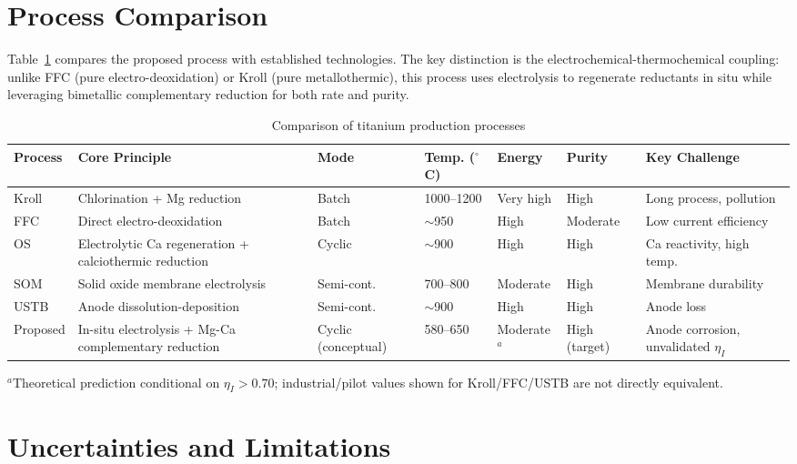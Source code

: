 \documentclass[sn-mathphys,Numbered]{sn-jnl}
\begin{document}
\section{Process Comparison}

Table~\ref{tab:compare} compares the proposed process with established technologies. The key distinction is the electrochemical-thermochemical coupling: unlike FFC (pure electro-deoxidation) or Kroll (pure metallothermic), this process uses electrolysis to regenerate reductants in situ while leveraging bimetallic complementary reduction for both rate and purity.

\begin{table}[!ht]
  \centering
  \caption{Comparison of titanium production processes}
  \label{tab:compare}
  \footnotesize
  \begin{tabularx}{\linewidth}{@{} p{1.5cm} p{3.0cm} p{1.2cm} p{1.0cm} p{1.2cm} p{1.0cm} X @{}}
  \toprule
  Process & Core Principle & Mode & Temp. ($^{\circ}$C) & Energy & Purity & Key Challenge \\
  \midrule
  Kroll & Chlorination + Mg reduction & Batch & 1000--1200 & Very high & High & Long process, pollution \\
  FFC & Direct electro-deoxidation & Batch & $\sim$950 & High & Moderate & Low current efficiency \\
  OS & Electrolytic Ca regeneration + calciothermic reduction & Cyclic & $\sim$900 & High & High & Ca reactivity, high temp. \\
  SOM & Solid oxide membrane electrolysis & Semi-cont. & 700--800 & Moderate & High & Membrane durability \\
  USTB & Anode dissolution-deposition & Semi-cont. & $\sim$900 & High & High & Anode loss \\
  Proposed & In-situ electrolysis + Mg-Ca complementary reduction & Cyclic (conceptual) & 580--650 & Moderate$^{a}$ & High (target) & Anode corrosion, unvalidated $\eta_I$ \\
  \bottomrule
  \end{tabularx}
  \par\vspace{2pt}
  \footnotesize $^{a}$Theoretical prediction conditional on $\eta_I > 0.70$; industrial/pilot values shown for Kroll/FFC/USTB are not directly equivalent.
\end{table}

\section{Uncertainties and Limitations}
\end{document}
